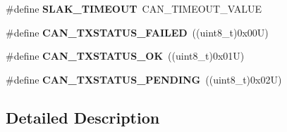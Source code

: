 \begin{DoxyCompactItemize}
\item 
\mbox{\label{group___h_a_l___c_a_n___aliased___defines_ga1bb8107706c8b4039ac55a122f3c65bb}} 
\#define {\bfseries S\+L\+A\+K\+\_\+\+T\+I\+M\+E\+O\+UT}~C\+A\+N\+\_\+\+T\+I\+M\+E\+O\+U\+T\+\_\+\+V\+A\+L\+UE
\item 
\mbox{\label{group___h_a_l___c_a_n___aliased___defines_gad6f04a4437ad8e83b154523f20985796}} 
\#define {\bfseries C\+A\+N\+\_\+\+T\+X\+S\+T\+A\+T\+U\+S\+\_\+\+F\+A\+I\+L\+ED}~((uint8\+\_\+t)0x00\+U)
\item 
\mbox{\label{group___h_a_l___c_a_n___aliased___defines_ga01cd38ecda448043ba6a7870ab62fc2b}} 
\#define {\bfseries C\+A\+N\+\_\+\+T\+X\+S\+T\+A\+T\+U\+S\+\_\+\+OK}~((uint8\+\_\+t)0x01\+U)
\item 
\mbox{\label{group___h_a_l___c_a_n___aliased___defines_gaf63b6b17ef36507122e0eaac8395aa1c}} 
\#define {\bfseries C\+A\+N\+\_\+\+T\+X\+S\+T\+A\+T\+U\+S\+\_\+\+P\+E\+N\+D\+I\+NG}~((uint8\+\_\+t)0x02\+U)
\end{DoxyCompactItemize}


\subsection{Detailed Description}
